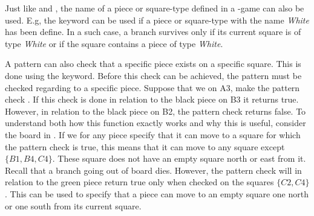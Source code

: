 Just like  and , the name of a piece or square-type defined in a \productname{}-game can also be used. E.g, the keyword  can be used if a piece or square-type with the name \textit{White} has been define. In a such case, a branch survives only if its current square is of type \textit{White} or if the square contains a piece of type \textit{White}.

A pattern can also check that a specific piece exists on a specific square. This is done using the  keyword.
Before this check can be achieved, the pattern must be checked regarding to a specific piece. Suppose that we on A3, make the pattern check
. If this check is done in relation to the black piece on B3 it returns true. However, in relation to the black piece on B2, the pattern check returns false. To understand both how this function exactly works and why this is useful, consider the board in .
If we for any piece specify that it can move to a square for which the pattern check  is true, this means that it can move to any square except $\{B1, B4, C4\}$. These square does not have an empty square north or east from it. Recall that a branch going out of board dies.
However, the pattern check  will in relation to the green piece return true only when checked on the squares $\{C2, C4\}$.
This can be used to specify that a piece can move to an empty square one north or one south from its current square. 